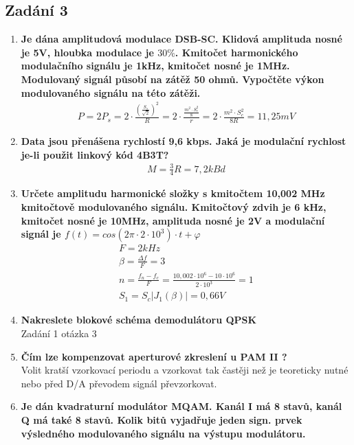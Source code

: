 \subsection{Zadání 3}
\begin{enumerate}
    \item \textbf{Je dána amplitudová modulace DSB-SC. Klidová amplituda nosné je 5V, hloubka modulace
    je \(30\%\). Kmitočet harmonického modulačního signálu je 1kHz, kmitočet nosné je 1MHz.
    Modulovaný signál působí na zátěž 50 ohmů. Vypočtěte výkon modulovaného signálu na
    této zátěži.}
    \begin{align*}
        P = 2P_s = 2\cdot\frac{(\frac{S_s}{\sqrt{2}})^2}{R} = 2\cdot\frac{\frac{m^2\cdot S_c^2}{8}}{r} = 2\cdot\frac{m^2\cdot S_c^2}{8R} = 11,25mV
    \end{align*}
    \item \textbf{Data jsou přenášena rychlostí 9,6 kbps. Jaká je modulační rychlost je-li použit linkový kód
    4B3T?}
    \begin{align*}
        M = \frac{3}{4}R = 7,2kBd
    \end{align*}
    \item \textbf{Určete amplitudu harmonické složky s kmitočtem 10,002 MHz kmitočtově modulovaného
    signálu. Kmitočtový zdvih je 6 kHz, kmitočet nosné je 10MHz, amplituda nosné je 2V a
    modulační signál je \(f(t)=cos(2\pi\cdot 2\cdot10^3)\cdot t + \varphi\)}
    \begin{gather*}
        F = 2kHz\\
        \beta = \frac{\Delta f}{F} = 3\\
        n = \frac{f_n - f_c}{F} = \frac{10,002\cdot10^6 - 10\cdot10^6}{2\cdot10^3} = 1\\
        S_1 = S_c \left |J_1(\beta) \right | = 0,66V
    \end{gather*}
    \item \textbf{Nakreslete blokové schéma demodulátoru QPSK}\\
    Zadání 1 otázka 3
    \item \textbf{Čím lze kompenzovat aperturové zkreslení u PAM II ?}\\
    Volit kratší vzorkovací periodu a vzorkovat tak častěji než je teoreticky nutné nebo před D/A převodem signál převzorkovat.
    \item \textbf{Je dán kvadraturní modulátor MQAM. Kanál I má 8 stavů, kanál Q má také 8 stavů. Kolik
    bitů vyjadřuje jeden sign. prvek výsledného modulovaného signálu na výstupu modulátoru.}\\

\end{enumerate}
